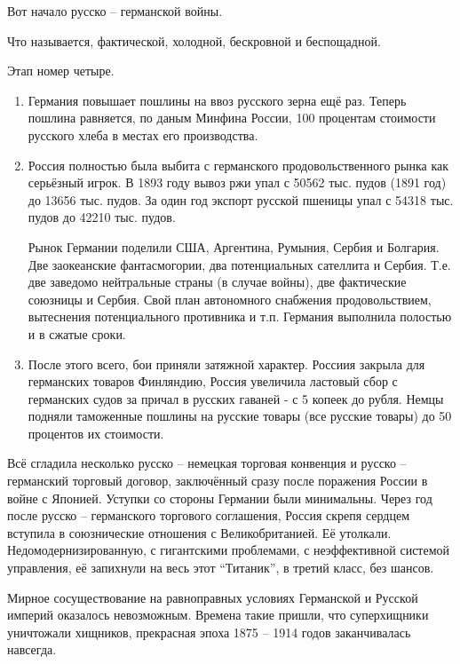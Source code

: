 Вот начало русско -- германской войны.

Что называется, фактической, холодной, бескровной и беспощадной.

\vspace{1ex}\noindent
Этап номер четыре.

\begin{enumerate}
\item Германия повышает пошлины на ввоз русского зерна ещё раз. Теперь пошлина
равняется, по даным Минфина России, 100 процентам стоимости русского хлеба в
местах его производства.

\item Россия полностью была выбита с германского продовольственного рынка как
серьёзный игрок. В 1893 году вывоз ржи упал с 50562 тыс. пудов (1891 год) до
13656 тыс. пудов. За один год экспорт русской пшеницы упал с 54318 тыс. пудов до
42210 тыс. пудов.

Рынок Германии поделили США, Аргентина, Румыния, Сербия и Болгария. Две
заокеанские фантасмогории, два потенциальных сателлита и Сербия. Т.е. две
заведомо нейтральные страны (в случае войны), две фактические союзницы и Сербия.
Свой план автономного снабжения продовольствием, вытеснения потенциального
противника и т.п. Германия выполнила полостью и в сжатые сроки.

\item После этого всего, бои приняли затяжной характер. Россиия закрыла для
германских товаров Финляндию, Россия увеличила ластовый сбор с германских
судов за причал в русских гаваней - с 5 копеек до рубля. Немцы подняли
таможенные пошлины на русские товары (все русские товары) до 50 процентов их
стоимости.
\end{enumerate}

Всё сгладила несколько русско -- немецкая торговая конвенция и русско -- германский
торговый договор, заключённый сразу после поражения России в войне с Японией.
Уступки со стороны Германии были минимальны. Через год после русско -- германского
торгового соглашения, Россия скрепя сердцем вступила в союзнические отношения с
Великобританией. Её утолкали. Недомодернизированную, с гигантскими проблемами,
с неэффективной системой управления, её запихнули на весь этот \enquote{Титаник},
в третий класс, без шансов.

Мирное сосуществование на равноправных условиях Германской и Русской империй
оказалось невозможным. Времена такие пришли, что суперхищники уничтожали
хищников, прекрасная эпоха 1875 -- 1914 годов заканчивалась навсегда.
